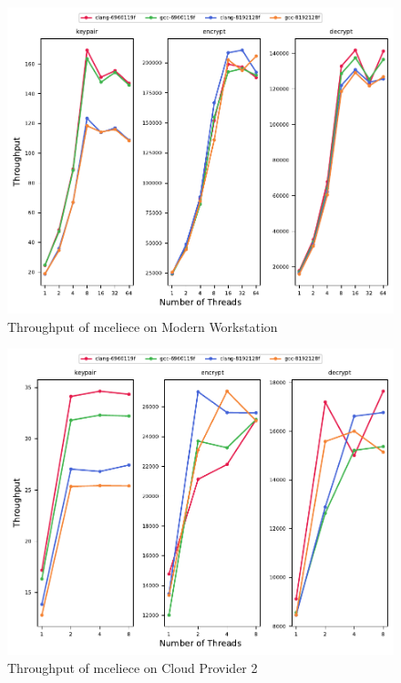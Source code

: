 \begin{figure}
    \centering
    \includegraphics[scale=0.75]{chapters/results/throughput/Modern Workstation_mceliece.pdf}
    \caption{Throughput of \gls{mceliece} on Modern Workstation}
    \label{figure:results:throughput:mceliece:modern-workstation}
\end{figure}

\begin{figure}
    \centering
    \includegraphics[scale=0.75]{chapters/results/throughput/Cloud Provider 2_mceliece.pdf}
    \caption{Throughput of \gls{mceliece} on Cloud Provider 2}
    \label{figure:results:throughput:mceliece:cloud-provider-2}
\end{figure}



